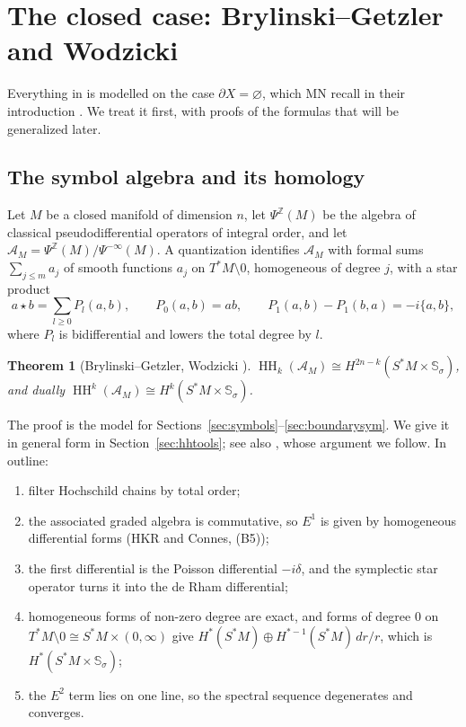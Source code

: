 \documentclass[11pt,oneside,reqno]{article}
\DeclareMathOperator{\HH}{HH}
\newcommand{\Z}{\mathbb Z}
\newcommand{\cA}{\mathcal A}
\newcommand{\Ssig}{\mathbb S_\sigma}
\theoremstyle{plain}
\newtheorem{theorem}{Theorem}[section]
\theoremstyle{definition}
\theoremstyle{remark}
\begin{document}
\section{The closed case: Brylinski--Getzler and Wodzicki}\label{sec:closed}

Everything in \cite{MN} is modelled on the case \(\partial X=\varnothing\),
which MN recall in their introduction \cite[(1)--(5)]{MN}. We treat it
first, with proofs of the formulas that will be generalized later.

\subsection{The symbol algebra and its homology}
Let \(M\) be a closed manifold of dimension \(n\), let \(\Psi^{\Z}(M)\) be
the algebra of classical pseudodifferential operators of integral order,
and let \(\cA_M=\Psi^{\Z}(M)/\Psi^{-\infty}(M)\). A quantization identifies
\(\cA_M\) with formal sums \(\sum_{j\le m}a_j\) of smooth functions
\(a_j\) on \(T^*M\setminus0\), homogeneous of degree \(j\), with a star
product
\[
 a\star b=\sum_{l\ge0}P_l(a,b),\qquad P_0(a,b)=ab,\qquad
 P_1(a,b)-P_1(b,a)=-i\{a,b\},
\]
where \(P_l\) is bidifferential and lowers the total degree by \(l\).

\begin{theorem}[Brylinski--Getzler, Wodzicki \cite{BG,Wodzicki-cyclic}]
\label{thm:BG}
\(\HH_k(\cA_M)\cong H^{2n-k}(S^*M\times\Ssig)\), and dually
\(\HH^k(\cA_M)\cong H^k(S^*M\times\Ssig)\).
\end{theorem}

The proof is the model for Sections~\ref{sec:symbols}--\ref{sec:boundarysym}.
We give it in general form in Section~\ref{sec:hhtools}; see also
\cite[Ch.~10]{MelroseMicro}, whose argument we follow. In outline:
\begin{enumerate}
\item filter Hochschild chains by total order;
\item the associated graded algebra is commutative, so \(E^1\) is given
by homogeneous differential forms (HKR and Connes, (B5));
\item the first differential is the Poisson differential \(-i\delta\),
and the symplectic star operator turns it into the de Rham differential;
\item homogeneous forms of non-zero degree are exact, and forms of degree
\(0\) on \(T^*M\setminus0\cong S^*M\times(0,\infty)\) give
\(H^*(S^*M)\oplus H^{*-1}(S^*M)\,dr/r\), which is \(H^*(S^*M\times\Ssig)\);
\item the \(E^2\) term lies on one line, so the spectral sequence
degenerates and converges.
\end{enumerate}
\end{document}
